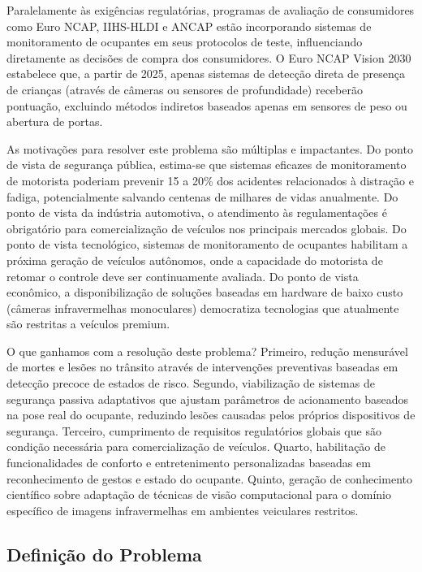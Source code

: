 \documentclass[12pt, a4paper]{article}
\begin{document}
Paralelamente às exigências regulatórias, programas de avaliação de consumidores como Euro NCAP, IIHS-HLDI e ANCAP estão incorporando sistemas de monitoramento de ocupantes em seus protocolos de teste, influenciando diretamente as decisões de compra dos consumidores. O Euro NCAP Vision 2030 estabelece que, a partir de 2025, apenas sistemas de detecção direta de presença de crianças (através de câmeras ou sensores de profundidade) receberão pontuação, excluindo métodos indiretos baseados apenas em sensores de peso ou abertura de portas.

As motivações para resolver este problema são múltiplas e impactantes. Do ponto de vista de segurança pública, estima-se que sistemas eficazes de monitoramento de motorista poderiam prevenir 15 a 20\% dos acidentes relacionados à distração e fadiga, potencialmente salvando centenas de milhares de vidas anualmente. Do ponto de vista da indústria automotiva, o atendimento às regulamentações é obrigatório para comercialização de veículos nos principais mercados globais. Do ponto de vista tecnológico, sistemas de monitoramento de ocupantes habilitam a próxima geração de veículos autônomos, onde a capacidade do motorista de retomar o controle deve ser continuamente avaliada. Do ponto de vista econômico, a disponibilização de soluções baseadas em hardware de baixo custo (câmeras infravermelhas monoculares) democratiza tecnologias que atualmente são restritas a veículos premium.

O que ganhamos com a resolução deste problema? Primeiro, redução mensurável de mortes e lesões no trânsito através de intervenções preventivas baseadas em detecção precoce de estados de risco. Segundo, viabilização de sistemas de segurança passiva adaptativos que ajustam parâmetros de acionamento baseados na pose real do ocupante, reduzindo lesões causadas pelos próprios dispositivos de segurança. Terceiro, cumprimento de requisitos regulatórios globais que são condição necessária para comercialização de veículos. Quarto, habilitação de funcionalidades de conforto e entretenimento personalizadas baseadas em reconhecimento de gestos e estado do ocupante. Quinto, geração de conhecimento científico sobre adaptação de técnicas de visão computacional para o domínio específico de imagens infravermelhas em ambientes veiculares restritos.

\subsection{Definição do Problema}
\end{document}
